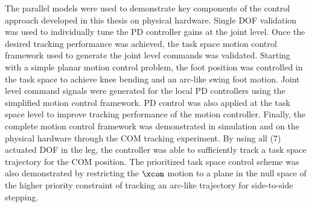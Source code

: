 The parallel models were used to demonstrate key components of the control approach developed in this thesis on physical hardware. Single DOF validation was used to individually tune the PD controller gains at the joint level. Once the desired tracking performance was achieved, the task space motion control framework used to generate the joint level commands was validated. Starting with a simple planar motion control problem, the foot position was controlled in the task space to achieve knee bending and an arc-like swing foot motion. Joint level command signals were generated for the local PD controllers using the simplified motion control framework. PD control was also applied at the task space level to improve tracking performance of the motion controller. Finally, the complete motion control framework was demonstrated in simulation and on the physical hardware through the COM tracking experiment. By using all (7) actuated DOF in the leg, the controller was able to sufficiently track a task space trajectory for the COM position. The prioritized task space control scheme was also demonstrated by restricting the $\xcom$ motion to a plane in the null space of the higher priority constraint of tracking an arc-like trajectory for side-to-side stepping. 



